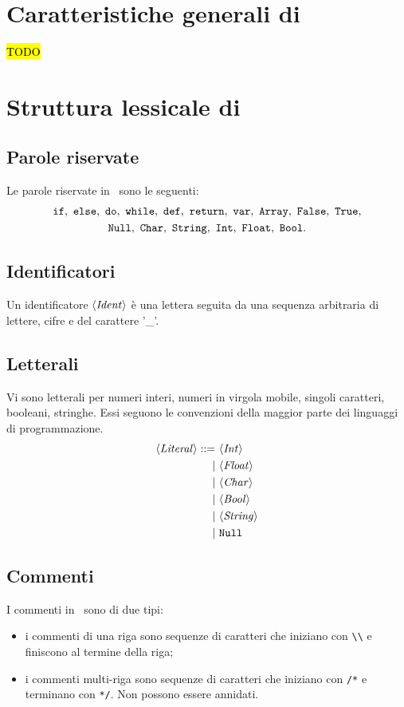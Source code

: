 \section{Caratteristiche generali di \SBF}
\hl{TODO}

\section{Struttura lessicale di \SBF}

\subsection*{Parole riservate}
Le parole riservate in \SBF\ sono le seguenti:
\begin{gather*}
\If,\ \Else,\ \Do,\ \While,\ \Def,\ \Return,\ \Var,\ \texttt{Array},\ \False,\ \True,\\
\texttt{Null},\ \texttt{Char},\ \texttt{String},\ \texttt{Int},\ \texttt{Float},\ \texttt{Bool}.
\end{gather*}

\subsection*{Identificatori}

Un identificatore $\langle \mathit{Ident} \rangle$ è una lettera seguita da una sequenza arbitraria di lettere, cifre e del carattere '\_'.

\subsection*{Letterali}
Vi sono letterali per numeri interi, numeri in virgola mobile, singoli caratteri, booleani, stringhe. Essi seguono le convenzioni della maggior parte dei linguaggi di programmazione.
\begin{align*}
\token{Literal} ::=\ 
& \token{Int}\\
|\ & \token{Float}\\
|\ & \token{Char}\\
|\ & \token{Bool}\\
|\ & \token{String}\\
|\ & \texttt{Null}
\end{align*}

\subsection*{Commenti}
I commenti in \SBF\ sono di due tipi:
\begin{itemize}
	\item i commenti di una riga sono sequenze di caratteri che iniziano con \verb$\\$ e finiscono al termine della riga;
	\item i commenti multi-riga sono sequenze di caratteri che iniziano con \verb$/*$ e terminano con \verb$*/$. Non possono essere annidati.
\end{itemize}

